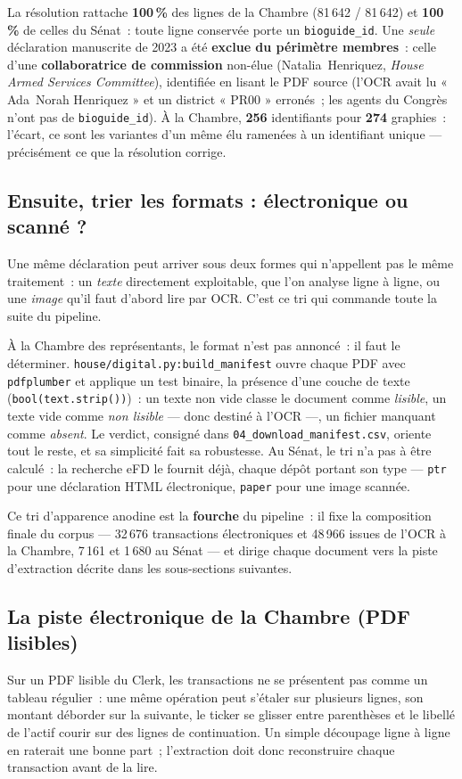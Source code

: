 \documentclass[11pt,a4paper]{article}
\newcommand{\co}[1]{\texttt{\small #1}}
\begin{document}
La résolution rattache \textbf{100\,\%} des lignes de la Chambre (81\,642 / 81\,642) et \textbf{100\,\%}
de celles du Sénat~: toute ligne conservée porte un \co{bioguide_id}. Une \emph{seule} déclaration
manuscrite de 2023 a été \textbf{exclue du périmètre membres}~: celle d'une \textbf{collaboratrice de
commission} non-élue (Natalia~Henriquez, \emph{House Armed Services Committee}), identifiée en lisant le
PDF source (l'OCR avait lu « Ada~Norah Henriquez » et un district « PR00 » erronés~; les agents du Congrès
n'ont pas de \co{bioguide_id}). À la Chambre, \textbf{256}
identifiants pour \textbf{274} graphies~: l'écart, ce sont les variantes d'un même élu ramenées à un
identifiant unique — précisément ce que la résolution corrige.

\subsection{Ensuite, trier les formats : électronique ou scanné ?}
\label{sec:tri}
Une même déclaration peut arriver sous deux formes qui n'appellent pas le même traitement~: un
\emph{texte} directement exploitable, que l'on analyse ligne à ligne, ou une \emph{image} qu'il faut
d'abord lire par OCR. C'est ce tri qui commande toute la suite du pipeline.

À la Chambre des représentants, le format n'est pas annoncé~: il faut le déterminer.
\co{house/digital.py:build_manifest} ouvre chaque PDF avec \co{pdfplumber} et applique un test binaire, la
présence d'une couche de texte (\co{bool(text.strip())})~: un texte non vide classe le document comme
\emph{lisible}, un texte vide comme \emph{non lisible} — donc destiné à l'OCR —, un fichier manquant comme
\emph{absent}. Le verdict, consigné dans \co{04_download_manifest.csv}, oriente tout le reste, et sa
simplicité fait sa robustesse. Au Sénat, le tri n'a pas à être calculé~: la recherche eFD le fournit déjà,
chaque dépôt portant son type — \co{ptr} pour une déclaration HTML électronique, \co{paper} pour une image
scannée.

Ce tri d'apparence anodine est la \textbf{fourche} du pipeline~: il fixe la composition finale du corpus —
32\,676 transactions électroniques et 48\,966 issues de l'OCR à la Chambre, 7\,161 et 1\,680 au Sénat — et
dirige chaque document vers la piste d'extraction décrite dans les sous-sections suivantes.

\subsection{La piste électronique de la Chambre (PDF lisibles)}
\label{sec:hdig}
Sur un PDF lisible du Clerk, les transactions ne se présentent pas comme un tableau régulier~: une même
opération peut s'étaler sur plusieurs lignes, son montant déborder sur la suivante, le ticker se glisser
entre parenthèses et le libellé de l'actif courir sur des lignes de continuation. Un simple découpage ligne
à ligne en raterait une bonne part~; l'extraction doit donc reconstruire chaque transaction avant de la
lire.
\end{document}
